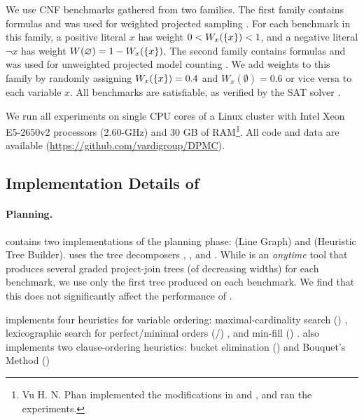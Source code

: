 We use \benchmarks{} CNF benchmarks gathered from two families.
The first family contains \wapsBenchmarks{} formulas and was used for weighted projected sampling \cite{gupta2019waps}.
For each benchmark in this family, a positive literal $x$ has weight $0 < W_x(\left\{ x \right\}) < 1$, and a negative literal $\neg x$ has weight $W(\varnothing) = 1 - W_x(\left\{ x \right\})$.
The second family contains \birdBenchmarks{} formulas and was used for unweighted projected model counting \cite{soos2019bird}.
We add weights to this family by randomly assigning $W_x(\left\{ x \right\}) = 0.4$ and $W_x(\emptyset) = 0.6$ or vice versa to each variable $x$.
All \benchmarks{} benchmarks are satisfiable, as verified by the SAT solver \sat{} \cite{soos2009extending}.

We run all experiments on single CPU cores of a Linux cluster with Intel Xeon E5-2650v2 processors (2.60-GHz) and 30 GB of RAM\footnote{
Vu H. N. Phan implemented the modifications in \Htb{} and \Dmc{}, and ran the experiments.}.
All code and data are available (\url{https://github.com/vardigroup/DPMC}).

\noindent

\subsection{Implementation Details of }
\label{sec:procount:experiments:impl}

\paragraph{Planning.} 
 contains two implementations of the planning phase: \Lg{} (Line Graph) and \Htb{} (Heuristic Tree Builder).
\Lg{} uses the tree decomposers \flowcutter{} \cite{strasser2017computing}, \htd{} \cite{AMW17}, and \tamaki{} \cite{Tamaki17}.
While \Lg{} is an \emph{anytime} tool that produces several graded project-join trees (of decreasing widths) for each benchmark, we use only the first tree produced on each benchmark.
We find that this does not significantly affect the performance of \procount{}.

\htb{} implements four heuristics for variable ordering: maximal-cardinality search (\mcs{}) \cite{tarjan1984simple}, lexicographic search for perfect/minimal orders (\lexp/\lexm{}) \cite{koster2001treewidth}, and min-fill (\minfill{}) \cite{dechter03}.
\htb{} also implements two clause-ordering heuristics: bucket elimination (\be) \cite{dechter99} and Bouquet's Method (\bm) \cite{bouquet1999gestion}%

